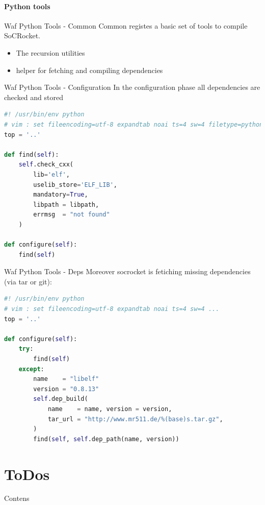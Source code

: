 \documentclass[fleqn,11pt,aspectratio=43]{beamer}
\begin{document}
\subsection{Python tools}
\begin{frame}[fragile]{Waf Python Tools - Common}
Common registes a basic set of tools to compile SoCRocket.
\begin{itemize}
  \item The recursion utilities
  \item helper for fetching and compiling dependencies
\end{itemize}
\end{frame}

\begin{frame}[fragile]{Waf Python Tools - Configuration}
In the configuration phase all dependencies are checked and stored 
\begin{lstlisting}[language=python]
#! /usr/bin/env python
# vim : set fileencoding=utf-8 expandtab noai ts=4 sw=4 filetype=python :
top = '..'

def find(self):
    self.check_cxx(
        lib='elf',
        uselib_store='ELF_LIB',
        mandatory=True,
        libpath = libpath,
        errmsg  = "not found"
    )

def configure(self):
    find(self)
\end{lstlisting}
\end{frame}

\begin{frame}[fragile]{Waf Python Tools - Deps}
Moreover socrocket is fetiching missing dependencies (via tar or git):
\begin{lstlisting}[language=python]
#! /usr/bin/env python
# vim : set fileencoding=utf-8 expandtab noai ts=4 sw=4 ...
top = '..'

def configure(self):
    try:
        find(self)
    except:
        name    = "libelf"
        version = "0.8.13"
        self.dep_build(
            name    = name, version = version,
            tar_url = "http://www.mr511.de/%(base)s.tar.gz",
        )
        find(self, self.dep_path(name, version))
\end{lstlisting}
\end{frame}

\part{ToDos}

\begin{frame}[plain]
  \partpage
\end{frame}
\begin{frame}{Contens}
\tableofcontents
\end{frame}
\end{document}
